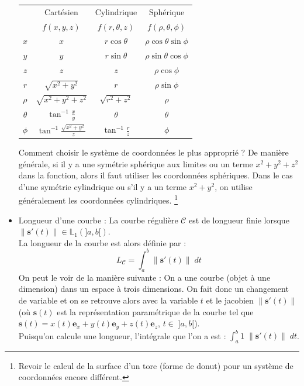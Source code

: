 \documentclass[a4paper]{article}
\begin{document}
\begin{itemize}
\begin{center}
    \begin{tabular}{|c|ccc|} \hline
        & Cartésien & Cylindrique & Sphérique \\
        & $f(x,y,z)$ & $f(r,\theta,z)$ & $f(\rho,\theta,\phi)$ \\ \hline
        $x$ & $x$ & $r \cos\theta$ & $\rho \cos\theta \sin\phi$ \\
        $y$ & $y$ & $r \sin\theta$ & $\rho \sin\theta \cos\phi$ \\
        $z$ & $z$ & $z$ & $\rho \cos\phi$ \\
        $r$ & $\sqrt{x^2+y^2}$ & $r$ & $\rho \sin\phi$ \\
        $\rho$ & $\sqrt{x^2+y^2+z^2}$ & $\sqrt{r^2+z^2}$ & $\rho$ \\
        $\theta$ & $\tan^{-1} \frac{x}{y}$ & $\theta$ & $\theta$ \\
        $\phi$ & $\tan^{-1}\frac{\sqrt{x^2+y^2}}{z}$ & $\tan^{-1}\frac{r}{z}$ & $\phi$ \\ \hline
    \end{tabular}
\end{center}

Comment choisir le système de coordonnées le plus approprié ? De manière générale, si il y a une symétrie sphérique aux limites ou un terme $ x^2 + y^2 + z^2 $ dans la fonction, alors il faut utiliser les coordonnées sphériques. Dans le cas d'une symétrie cylindrique ou s'il y a un terme $ x^2 + y^2 $, on utilise généralement les coordonnées cylindriques. \footnote{Revoir le calcul de la surface d'un tore (forme de donut) pour un système de coordonnées encore différent.}






\item Longueur d'une courbe : La courbe régulière $ \mathcal{C} $ est de longueur finie lorsque $ \| \textbf{s}'(t) \| \in \mathbb{L}_1(]a, b[) $. \\
La longueur de la courbe est alors définie par : 
\[ L_{\mathcal{C}} = \int_a^b \| \textbf{s}'(t) \| \; dt \]
On peut le voir de la manière suivante : On a une courbe (objet à une dimension) dans un espace à trois dimensions. On fait donc un changement de variable et on se retrouve alors avec la variable $ t $ et le jacobien $ \| \textbf{s}'(t) \| $ (où $ \textbf{s}(t) $ est la représentation paramétrique de la courbe tel que $ \textbf{s}(t) = x(t) \textbf{e}_x + y(t) \textbf{e}_y + z(t) \textbf{e}_z $, \; $ t \in \; ]a, b[ $). \\
Puisqu'on calcule une longueur, l'intégrale que l'on a est : $\displaystyle \int_a^b 1 \; \| \textbf{s}'(t) \| \; d t $.


\end{itemize}
\end{document}
